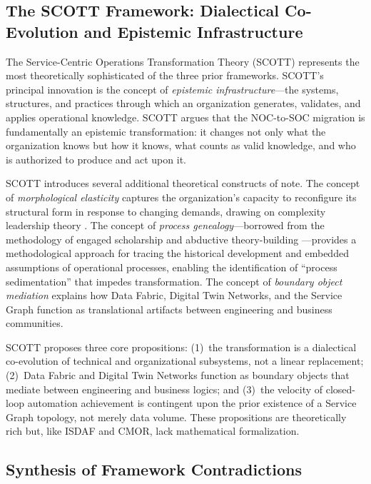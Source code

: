 \documentclass[12pt,a4paper]{article}
\begin{document}
\subsection{The SCOTT Framework: Dialectical Co-Evolution and Epistemic Infrastructure}

The Service-Centric Operations Transformation Theory (SCOTT) represents the most theoretically sophisticated of the three prior frameworks. SCOTT's principal innovation is the concept of \textit{epistemic infrastructure}---the systems, structures, and practices through which an organization generates, validates, and applies operational knowledge. SCOTT argues that the NOC-to-SOC migration is fundamentally an epistemic transformation: it changes not only what the organization knows but how it knows, what counts as valid knowledge, and who is authorized to produce and act upon it.

SCOTT introduces several additional theoretical constructs of note. The concept of \textit{morphological elasticity} captures the organization's capacity to reconfigure its structural form in response to changing demands, drawing on complexity leadership theory \citep{uhl2007complexity}. The concept of \textit{process genealogy}---borrowed from the methodology of engaged scholarship \citep{vandeven2007engaged} and abductive theory-building \citep{lock2024abductive}---provides a methodological approach for tracing the historical development and embedded assumptions of operational processes, enabling the identification of ``process sedimentation'' that impedes transformation. The concept of \textit{boundary object mediation} \citep{star1989institutional} explains how Data Fabric, Digital Twin Networks, and the Service Graph function as translational artifacts between engineering and business communities.

SCOTT proposes three core propositions: (1)~the transformation is a dialectical co-evolution of technical and organizational subsystems, not a linear replacement; (2)~Data Fabric and Digital Twin Networks function as boundary objects that mediate between engineering and business logics; and (3)~the velocity of closed-loop automation achievement is contingent upon the prior existence of a Service Graph topology, not merely data volume. These propositions are theoretically rich but, like ISDAF and CMOR, lack mathematical formalization.

\subsection{Synthesis of Framework Contradictions}
\end{document}
